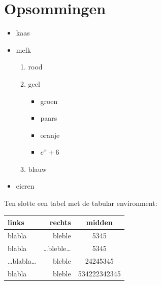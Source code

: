 \documentclass{article}
\begin{document}
\section{Opsommingen}
\begin{itemize}
\item kaas
\item melk
  \begin{enumerate}
\item rood
\item geel
  \begin{itemize}
  \item groen
  \item paars
  \item oranje
  \item $e^x+6$
  \end{itemize}
\item blauw
\end{enumerate}
\item eieren
\end{itemize}
Ten slotte een tabel met de tabular environment:\\
\vspace{5mm}

\begin{tabular}{|l|r||c|}
  \hline
  links &rechts &midden\\
  \hline\hline
  blabla&bleble&5345\\
  \hline
  blabla&\ldots bleble\ldots &5345\\
  \hline
  \ldots blabla\ldots &bleble&24245345\\
  \hline
  blabla&bleble&534222342345\\
  \hline
\end{tabular}
\end{document}
